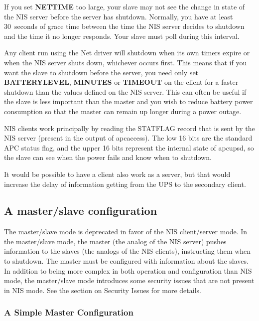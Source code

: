 If you set \textbf{NETTIME} too large, your slave may not see the
change in state of the NIS server before the server has shutdown. Normally,
you have at least 30~seconds of grace time between the time the NIS server
decides to shutdown and the time it no longer responds. Your slave must poll
during this interval.  

Any client run using the Net driver will shutdown when its own timers
expire or when the NIS server shuts down, whichever occurs first. This
means that if you want the slave to shutdown before the server, you need
only set \textbf{BATTERYLEVEL}, \textbf{MINUTES} or \textbf{TIMEOUT} on
the client for a faster shutdown than the values defined on the NIS
server.  This can often be useful if the slave is less important than the
master and you wish to reduce battery power consumption so that the
master can remain up longer during a power outage. 

NIS clients work principally by reading the STATFLAG record that is sent
by the NIS server (present in the output of apcaccess). The low 16 bits
are the standard APC status flag, and the upper 16 bits represent the
internal state of apcupsd, so the slave can see when the power fails and
know when to shutdown.  

It would be possible to have a client also work as a server, but that would
increase the delay of information getting from the UPS to the secondary
client.

\subsection*{A master/slave configuration}

The master/slave mode is deprecated in favor of the NIS client/server
mode.  In the master/slave mode, the master (the analog of the NIS server)
pushes information to the slaves (the analogs of the NIS clients),
instructing them when to shutdown.  The master must be configured with
information about the slaves.  In addition to being more complex in both
operation and configuration than NIS mode, the master/slave mode
introduces some security issues that are not present in NIS mode.  See
the section on Security Issues for more details.

\label{A-Simple-Master-Configuration}

\subsubsection*{A Simple Master Configuration}

